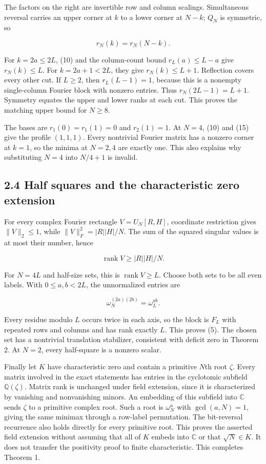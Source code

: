 \documentclass[
  11pt,
  letterpaper,
]{article}
\begin{document}
The factors on the right are invertible row and column scalings.
Simultaneous reversal carries an upper corner at \(k\) to a lower corner
at \(N-k\); \(Q_N\) is symmetric, so

\[
r_N(k)=r_N(N-k).                                           \tag{15}
\]

For \(k=2a\leq2L\), (10) and the column-count bound \(r_L(a)\leq L-a\)
give \(r_N(k)\leq L\). For \(k=2a+1<2L\), they give \(r_N(k)\leq L+1\).
Reflection covers every other cut. If \(L\geq2\), then \(r_L(L-1)=1\),
because this is a nonempty single-column Fourier block with nonzero
entries. Thus \(r_N(2L-1)=L+1\). Symmetry equates the upper and lower
ranks at each cut. This proves the matching upper bound for \(N\geq8\).

The bases are \(r_1(0)=r_1(1)=0\) and \(r_2(1)=1\). At \(N=4\), (10) and
(15) give the profile \((1,1,1)\). Every nontrivial Fourier matrix has a
nonzero corner at \(k=1\), so the minima at \(N=2,4\) are exactly one.
This also explains why substituting \(N=4\) into \(N/4+1\) is invalid.

\subsection{2.4 Half squares and the characteristic zero
extension}\label{half-squares-and-the-characteristic-zero-extension}

For every complex Fourier rectangle \(V=U_N[R,H]\), coordinate
restriction gives \(\|V\|_2\leq1\), while \(\|V\|_F^2=|R||H|/N\). The
sum of the squared singular values is at most their number, hence

\[
\operatorname{rank}V\geq |R||H|/N.                         \tag{16}
\]

For \(N=4L\) and half-size sets, this is \(\operatorname{rank}V\geq L\).
Choose both sets to be all even labels. With \(0\leq a,b<2L\), the
unnormalized entries are

\[
\omega_N^{(2a)(2b)}=\omega_L^{ab}.
\]

Every residue modulo \(L\) occurs twice in each axis, so the block is
\(F_L\) with repeated rows and columns and has rank exactly \(L\). This
proves (5). The chosen set has a nontrivial translation stabilizer,
consistent with deficit zero in Theorem 2. At \(N=2\), every half-square
is a nonzero scalar.

Finally let \(K\) have characteristic zero and contain a primitive
\(N\)th root \(\zeta\). Every matrix involved in the exact statements
has entries in the cyclotomic subfield \(\mathbb Q(\zeta)\). Matrix rank
is unchanged under field extension, since it is characterized by
vanishing and nonvanishing minors. An embedding of this subfield into
\(\mathbb C\) sends \(\zeta\) to a primitive complex root. Such a root
is \(\omega_N^a\) with \(\gcd(a,N)=1\), giving the same minimax through
a row-label permutation. The bit-reversal recurrence also holds directly
for every primitive root. This proves the asserted field extension
without assuming that all of \(K\) embeds into \(\mathbb C\) or that
\(\sqrt N\in K\). It does not transfer the positivity proof to finite
characteristic. This completes Theorem 1.
\end{document}
